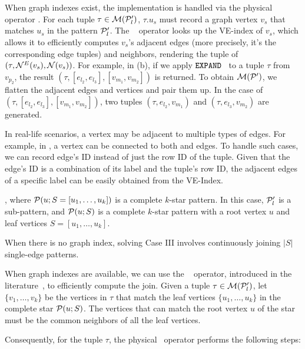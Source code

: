 When graph indexes exist, the implementation is handled via the physical operator . For each tuple $\tau \in \mathcal{M}(\mathcal{P}'_l)$, $\tau.u_s$ must record a graph vertex $v_s$ that matches $u_s$ in the pattern $\mathcal{P}'_l$. The \expand~ operator looks up the VE-index of $v_s$, which allows it to efficiently computes $v_s$'s adjacent edges (more precisely, it's the corresponding edge tuples) and neighbors, rendering the tuple of $(\tau, {\mathcal{N}}^E(v_s), {\mathcal{N}}(v_s))$. For example, in (b), if we apply ${\texttt{EXPAND}}$~ to a tuple $\tau$ from $v_{p_2}$, the result $(\tau, [e_{l_2}, e_{l_3}], [v_{m_1}, v_{m_2}])$ is returned.
To obtain $\mathcal{M}(\mathcal{P}')$, we flatten the adjacent edges and vertices and pair them up. In the case of $(\tau, [e_{l_2}, e_{l_3}], [v_{m_1}, v_{m_2}])$, two tuples $(\tau, e_{l_2}, v_{m_1})$ and $(\tau, e_{l_3}, v_{m_2})$ are generated.


In real-life scenarios, a vertex may be adjacent to multiple types of edges. For example, in , a  vertex can be connected to both  and  edges. To handle such cases, we can record edge's ID instead of just the row ID of the tuple. Given that the edge's ID is a combination of its label and the tuple's row ID, the adjacent edges of a specific label can be easily obtained from the VE-Index.

, where $\mathcal{P}(u;S = [u_1, \ldots, u_k])$ is a complete $k$-star pattern. In this case, $\mathcal{P}'_l$ is a sub-pattern, and $\mathcal{P}(u;S)$ is a complete $k$-star pattern with a root vertex $u$ and leaf vertices $S = [u_1, \ldots, u_k]$.

When there is no graph index, solving Case III involves continuously joining $|S|$ single-edge patterns.

When graph indexes are available, we can use the \expandintersect~ operator, introduced in the literature~\cite{huge,GLogS,mhedhbi2019optimizing}, to efficiently compute the join. Given a tuple $\tau \in \mathcal{M}(\mathcal{P}'_l)$, let $\{v_1, \ldots, v_k\}$ be the vertices in $\tau$ that match the leaf vertices $\{u_1, \ldots, u_k\}$ in the complete star $\mathcal{P}(u;S)$. The vertices that can match the root vertex $u$ of the star must be the common neighbors of all the leaf vertices.

Consequently, for the tuple $\tau$, the physical ~operator performs the following steps:

